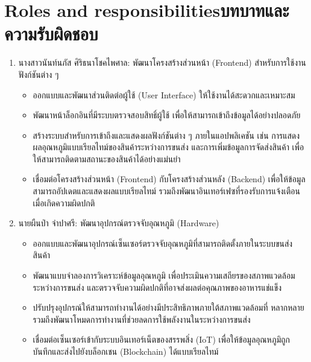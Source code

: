\section{\ifenglish Roles and responsibilities\else บทบาทและความรับผิดชอบ\fi}
\begin{enumerate}
    \item นางสาวนันท์นภัส ศิริธนาโชคไพศาล: พัฒนาโครงสร้างส่วนหน้า (Frontend) สำหรับการใช้งานฟังก์ชันต่าง ๆ
    \begin{itemize}
        \item ออกแบบและพัฒนาส่วนติดต่อผู้ใช้ (User Interface) ให้ใช้งานได้สะดวกและเหมาะสม
        \item พัฒนาหน้าล็อกอินที่มีระบบตรวจสอบสิทธิ์ผู้ใช้ เพื่อให้สามารถเข้าถึงข้อมูลได้อย่างปลอดภัย
        \item สร้างระบบสำหรับการเข้าถึงและแสดงผลฟังก์ชันต่าง ๆ ภายในแอปพลิเคชัน เช่น การแสดงผลอุณหภูมิแบบเรียลไทม์ของสินค้าระหว่างการขนส่ง และการเพิ่มข้อมูลการจัดส่งสินค้า เพื่อให้สามารถติดตามสถานะของสินค้าได้อย่างแม่นยำ
        \item เชื่อมต่อโครงสร้างส่วนหน้า (Frontend) กับโครงสร้างส่วนหลัง (Backend) เพื่อให้ข้อมูลสามารถอัปเดตและแสดงผลแบบเรียลไทม์ รวมถึงพัฒนาอินเทอร์เฟซที่รองรับการแจ้งเตือนเมื่อเกิดความผิดปกติ
    \end{itemize}
    
    \item นายผืนป่า จำปาศรี: พัฒนาอุปกรณ์ตรวจจับอุณหภูมิ (Hardware)
    \begin{itemize}
        \item ออกแบบและพัฒนาอุปกรณ์เซ็นเซอร์ตรวจจับอุณหภูมิที่สามารถติดตั้งภายในระบบขนส่งสินค้า
        \item พัฒนาแบบจำลองการวิเคราะห์ข้อมูลอุณหภูมิ เพื่อประเมินความเสถียรของสภาพแวดล้อมระหว่างการขนส่ง และตรวจจับความผิดปกติที่อาจส่งผลต่อคุณภาพของอาหารแช่แข็ง
        \item ปรับปรุงอุปกรณ์ให้สามารถทำงานได้อย่างมีประสิทธิภาพภายใต้สภาพแวดล้อมที่
        หลากหลาย รวมถึงพัฒนาโหมดการทำงานที่ช่วยลดการใช้พลังงานในระหว่างการขนส่ง
        \item เชื่อมต่อเซ็นเซอร์เข้ากับระบบอินเทอร์เน็ตของสรรพสิ่ง (IoT) เพื่อให้ข้อมูลอุณหภูมิถูกบันทึกและส่งไปยังบล็อกเชน (Blockchain) ได้แบบเรียลไทม์
    \end{itemize}


\end{enumerate}

